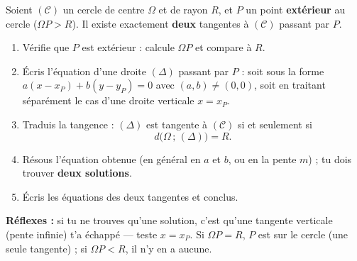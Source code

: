 \documentclass[11pt]{article}
\begin{document}
\begin{methode}
Soient $(\mathcal{C})$ un cercle de centre $\Omega$ et de rayon $R$, et $P$ un point \textbf{extérieur} au cercle ($\Omega P>R$). Il existe exactement \textbf{deux} tangentes à $(\mathcal{C})$ passant par $P$.
\begin{enumerate}
\item Vérifie que $P$ est extérieur : calcule $\Omega P$ et compare à $R$.
\item Écris l'équation d'une droite $(\Delta)$ passant par $P$ : soit sous la forme $a(x-x_P)+b(y-y_P)=0$ avec $(a,b)\neq(0,0)$, soit en traitant séparément le cas d'une droite verticale $x=x_P$.
\item Traduis la tangence : $(\Delta)$ est tangente à $(\mathcal{C})$ si et seulement si
\[d\big(\Omega\,;\,(\Delta)\big)=R.\]
\item Résous l'équation obtenue (en général en $a$ et $b$, ou en la pente $m$) ; tu dois trouver \textbf{deux solutions}.
\item Écris les équations des deux tangentes et conclus.
\end{enumerate}
\textbf{Réflexes :} si tu ne trouves qu'une solution, c'est qu'une tangente verticale (pente infinie) t'a échappé — teste $x=x_P$. Si $\Omega P=R$, $P$ est sur le cercle (une seule tangente) ; si $\Omega P<R$, il n'y en a aucune.
\end{methode}
\end{document}

